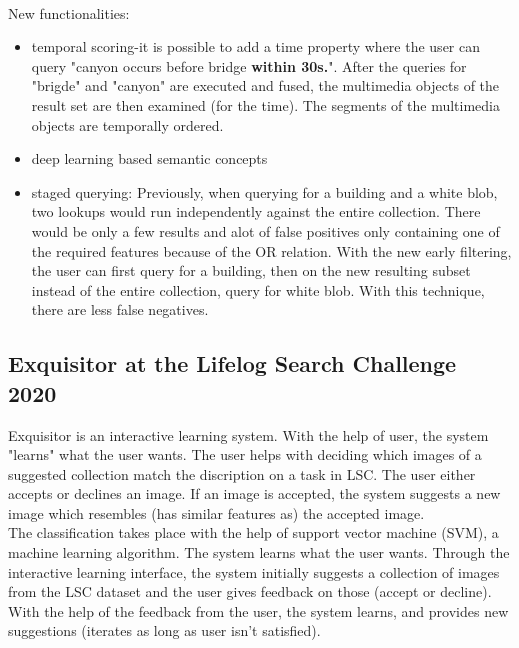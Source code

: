 \\
New functionalities:
\begin{itemize}
\item temporal scoring-it is possible to add a time property where the user can query "canyon occurs before bridge \textbf{within 30s.}". After the queries for "brigde" and "canyon" are executed and fused, the multimedia objects of the result set are then examined (for the time). The segments of the multimedia objects are temporally ordered. 

\item deep learning based semantic concepts

\item staged querying: Previously, when querying for a building and a white blob, two lookups would run independently against the entire collection. There would be only a few results and alot of false positives only containing one of the required features because of the OR relation. With the new early filtering, the user can first query for a building, then on the new resulting subset instead of the entire collection, query for white blob. With this technique, there are less false negatives.
\end{itemize}


\subsection{Exquisitor at the Lifelog Search Challenge 2020}
Exquisitor is an interactive learning system. With the help of user, the system "learns" what the user wants. The user helps with deciding which images of a suggested collection match the discription on a task in LSC. The user either accepts or declines an image. If an image is accepted, the system suggests a new image which resembles (has similar features as) the accepted image.\\

The classification takes place with the help of support vector machine (SVM), a machine learning algorithm. The system learns what the user wants. Through the interactive learning interface, the system initially suggests a collection of images from the LSC dataset and the user gives feedback on those (accept or decline). With the help of the feedback from the user, the system learns, and provides new suggestions (iterates as long as user isn't satisfied).


